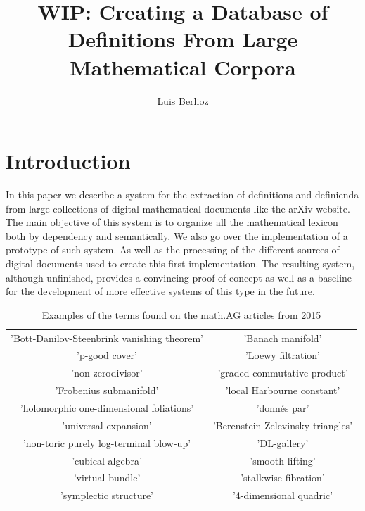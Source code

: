 \documentclass[a4paper]{easychair}
\author{Luis Berlioz}
\title{WIP: Creating a Database of Definitions From Large Mathematical Corpora}
\institute{
    University of Pittsburgh\\
    \email{lab232@pitt.edu}
}
\begin{document}
\maketitle
\begin{abstract}
   
\end{abstract}
\section{Introduction}
In this paper we describe a system for the extraction of definitions and definienda from large collections of digital mathematical documents like the arXiv website. The main objective of this system is to organize all the mathematical lexicon both by dependency and semantically.  We also go over the implementation of a prototype of such system. As well as the processing of the different sources of digital documents used to create this first implementation. The resulting system, although unfinished, provides a convincing proof  of concept as well as a baseline for the development of more effective systems of this type in the future.

\begin{table}[h]
    \sffamily
    \centering
    \begin{tabular}{cc}
        'Bott-Danilov-Steenbrink vanishing theorem' &

        'Banach manifold' \\

 'p-good cover'&

        'Loewy filtration' \\

 'non-zerodivisor'&

 'graded-commutative product'\\

        'Frobenius submanifold' &

 'local Harbourne constant'\\

        'holomorphic one-dimensional foliations' &

 'donnés par'\\

        'universal expansion' &

 'Berenstein-Zelevinsky triangles'\\

        'non-toric purely log-terminal blow-up' &

 'DL-gallery'\\

        'cubical algebra' &

 'smooth lifting'\\

        'virtual bundle' &

 'stalkwise fibration'\\

        'symplectic structure' &

 '4-dimensional quadric'\\
    \end{tabular}
    \caption{\label{sample}Examples of the terms found on the math.AG articles from 2015}
\end{table}
\end{document}
